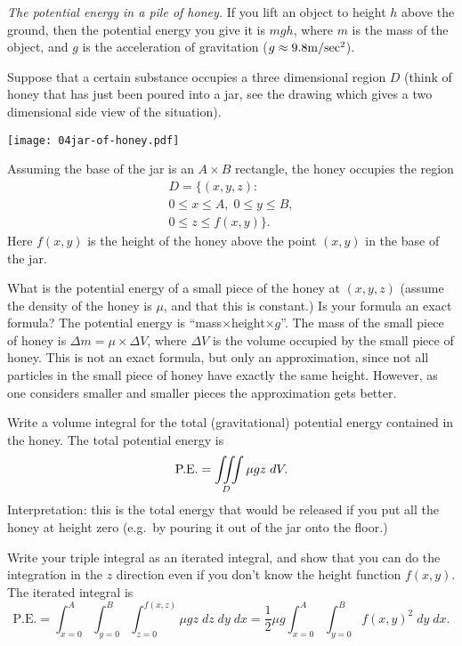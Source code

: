 \begin{multicols}{2}
\problem \textit{The potential energy in a pile of honey. }
If you lift an object to height $h$ above the ground, then the
potential energy you give it is $mgh$, where $m$ is the mass of the
object, and $g$ is the acceleration of gravitation ($g\approx 9.8 {\rm
m}/{\rm sec}^2$).

Suppose that a certain substance occupies a three dimensional region $D$
(think of honey that has just been poured into a jar, see the drawing
which gives a two dimensional side view of the situation).
\begin{center}
  \texttt{[image: 04jar-of-honey.pdf]}
\end{center}
Assuming the base of the jar is an $A\times B$ rectangle, the honey
occupies the region
\begin{multline*}
D = \bigl\{(x,y,z) :\\
0\leq x\leq A, \; 0\leq y\leq B,\\
0\leq z\leq f(x, y)\bigr\}.
\end{multline*}
Here $f(x, y)$ is the height of the honey above the point $(x, y)$ in
the base of the jar.

\subprob What is the potential energy of a small piece 
of the honey at $(x, y, z)$  (assume the density of the honey is
$\mu$, and that this is constant.)  Is your formula an exact
formula?  
\answer
The potential energy is ``mass$\times$height$\times g$''.  The mass of
the small piece of honey is $\Delta m = \mu\times \Delta V$, where
$\Delta V$ is the volume occupied by the small piece of honey.  This
is not an exact formula, but only an approximation, since not all
particles in the small piece of honey have exactly the same height.
However, as one considers smaller and smaller pieces the approximation
gets better.
\endanswer

\subprob Write a volume integral for the total 
(gravitational) potential energy contained in the honey.
\answer
The total potential energy is 
\[
\text{P.E.} = \iiint\limits _D \mu g z \; dV.
\]
Interpretation: this is the total energy that would be released if you
put all the honey at height zero (e.g.\ by pouring it out of the jar
onto the floor.)
\endanswer

\subprob Write your triple integral as an iterated integral, 
and show that you can do the integration in the $z$ direction even if
you don't know the height function $f(x, y)$.
\answer
The iterated integral is
\[
\text{P.E.} = 
\int_{x=0}^A \int_{y=0}^B \int_{z=0}^{f(x, z)} \mu g z \; dz\; dy\;
dx
=
\frac12 \mu g
\int_{x=0}^A \int_{y=0}^B f(x, y)^2 \; dy\; dx.
\]
\endanswer


\end{multicols}

